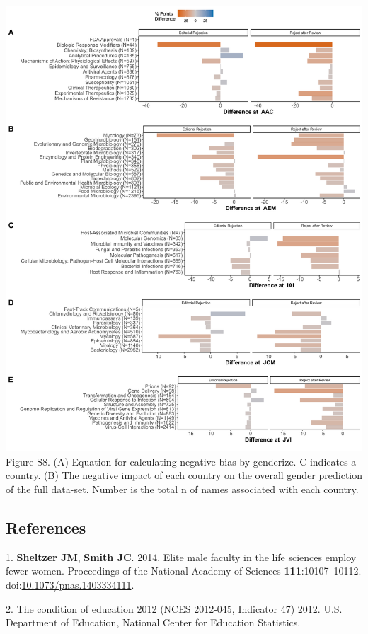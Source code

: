 \documentclass[11pt,]{article}
\begin{document}
\newpage

\includegraphics{Figure_S8.png} Figure S8. (A) Equation for calculating
negative bias by genderize. C indicates a country. (B) The negative
impact of each country on the overall gender prediction of the full
data-set. Number is the total n of names associated with each country.

\newpage

\subsection*{References}\label{references}

\hypertarget{refs}{}
\hypertarget{ref-sheltzer_elite_2014}{}
1. \textbf{Sheltzer JM}, \textbf{Smith JC}. 2014. Elite male faculty in
the life sciences employ fewer women. Proceedings of the National
Academy of Sciences \textbf{111}:10107--10112.
doi:\href{https://doi.org/10.1073/pnas.1403334111}{10.1073/pnas.1403334111}.

\hypertarget{ref-NCES_condition_2011}{}
2. The condition of education 2012 (NCES 2012-045, Indicator 47) 2012.
U.S. Department of Education, National Center for Education Statistics.
\end{document}
